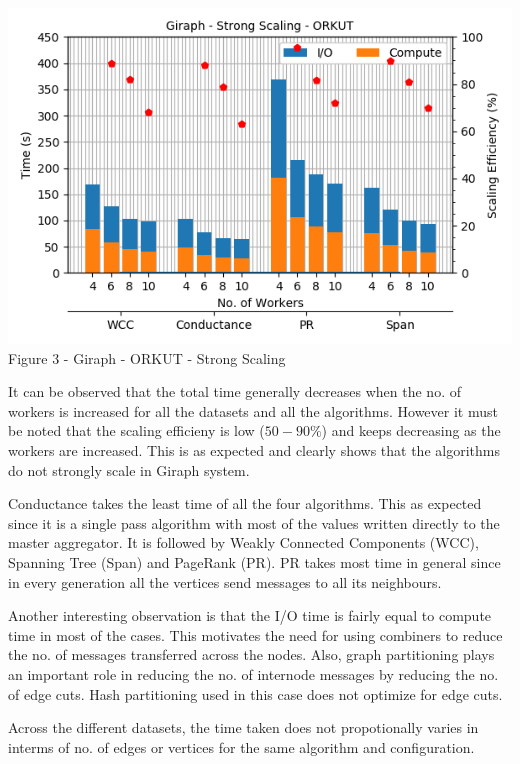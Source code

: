 \documentclass[11pt,a4paper,oneside]{article}
\begin{document}
    \begin{center}
    	\includegraphics[scale=0.5]{3.png} \\
    	Figure 3 - Giraph - ORKUT - Strong Scaling		
    \end{center}

    
    \pagebreak

    It can be observed that the total time generally decreases when the no. of workers is increased for all the datasets and all the algorithms. However it must be noted that the scaling efficieny is low ($50 -90 \%$) and keeps decreasing as the workers are increased. This is as expected and clearly shows that the algorithms do not strongly scale in Giraph system.
    
    Conductance takes the least time of all the four algorithms. This as expected since it is a single pass algorithm with most of the values written directly to the master aggregator. It is followed by Weakly Connected Components (WCC), Spanning Tree (Span) and PageRank (PR). PR takes most time in general since in every generation all the vertices send messages to all its neighbours. 
    
    Another interesting observation is that the I/O time is fairly equal to compute time in most of the cases. This motivates the need for using combiners to reduce the no. of messages transferred across the nodes. Also, graph partitioning plays an important role in reducing the no. of internode messages by reducing the no. of edge cuts. Hash partitioning used in this case does not optimize for edge cuts.
    
    Across the different datasets, the time taken does not propotionally varies in interms of no. of edges or vertices for the same algorithm and configuration. 
    
\end{document}
